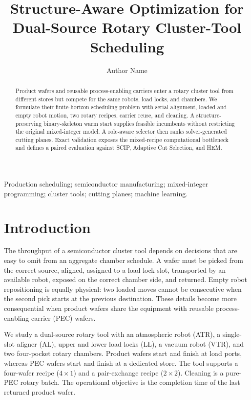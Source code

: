 \documentclass{ifacconf}
\begin{document}
\begin{frontmatter}

\title{Structure-Aware Optimization for Dual-Source Rotary Cluster-Tool Scheduling}

\author[inst]{Author Name}
\address[inst]{Affiliation, City, Country (e-mail: author@example.com).}

\begin{abstract}
Product wafers and reusable process-enabling carriers enter a rotary cluster tool from different stores but compete for the same robots, load locks, and chambers. We formulate their finite-horizon scheduling problem with serial alignment, loaded and empty robot motion, two rotary recipes, carrier reuse, and cleaning. A structure-preserving binary-skeleton warm start supplies feasible incumbents without restricting the original mixed-integer model. A role-aware selector then ranks solver-generated cutting planes. Exact validation exposes the mixed-recipe computational bottleneck and defines a paired evaluation against SCIP, Adaptive Cut Selection, and HEM.
\end{abstract}

\begin{keyword}
Production scheduling; semiconductor manufacturing; mixed-integer programming; cluster tools; cutting planes; machine learning.
\end{keyword}

\end{frontmatter}

\section{Introduction}

The throughput of a semiconductor cluster tool depends on decisions that are easy to omit from an aggregate chamber schedule. A wafer must be picked from the correct source, aligned, assigned to a load-lock slot, transported by an available robot, exposed on the correct chamber side, and returned. Empty robot repositioning is equally physical: two loaded moves cannot be consecutive when the second pick starts at the previous destination. These details become more consequential when product wafers share the equipment with reusable process-enabling carrier (PEC) wafers.

We study a dual-source rotary tool with an atmospheric robot (ATR), a single-slot aligner (AL), upper and lower load locks (LL), a vacuum robot (VTR), and two four-pocket rotary chambers. Product wafers start and finish at load ports, whereas PEC wafers start and finish at a dedicated store. The tool supports a four-wafer recipe ($4\times1$) and a pair-exchange recipe ($2\times2$). Cleaning is a pure-PEC rotary batch. The operational objective is the completion time of the last returned product wafer.
\end{document}
